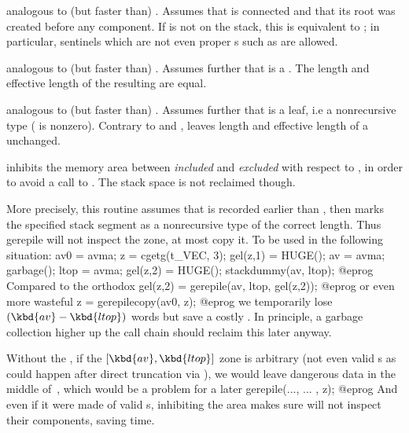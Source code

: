  analogous to (but faster than)
. Assumes that  is connected and that its root was
created before any component. If  is not on the stack, this is
equivalent to ; in particular, sentinels which are not even
proper s such as  are allowed.

 analogous to (but faster than)
. Assumes further that  is a . The
length and effective length of the resulting  are equal.

 analogous to (but faster than)
. Assumes further that  is a leaf, i.e a
nonrecursive type ( is nonzero). Contrary to
 and ,  leaves
length and effective length of a  unchanged.


 inhibits the memory area
between  \emph{included} and  \emph{excluded} with respect to
, in order to avoid a call to .
The stack space is not reclaimed though.

More precisely, this routine assumes that  is recorded earlier
than , then marks the specified stack segment as a
nonrecursive type of the correct length. Thus gerepile will not inspect
the zone, at most copy it. To be used in the following situation:
\bprog
  av0 = avma; z = cgetg(t_VEC, 3);
  gel(z,1) = HUGE(); av = avma; garbage(); ltop = avma;
  gel(z,2) = HUGE(); stackdummy(av, ltop);
@eprog\noindent
Compared to the orthodox
\bprog
  gel(z,2) = gerepile(av, ltop, gel(z,2));
@eprog\noindent
or even more wasteful
\bprog
  z = gerepilecopy(av0, z);
@eprog\noindent
we temporarily lose $(\kbd{av} - \kbd{ltop})$ words but save a costly
. In principle, a garbage collection higher up the call
chain should reclaim this later anyway.

Without the , if the $[\kbd{av}, \kbd{ltop}]$ zone is
arbitrary (not even valid s as could happen after direct
truncation via ), we would leave dangerous data in the middle
of~, which would be a problem for a later
\bprog
  gerepile(..., ... , z);
@eprog\noindent
And even if it were made of valid s, inhibiting the area makes sure
 will not inspect their components, saving time.

